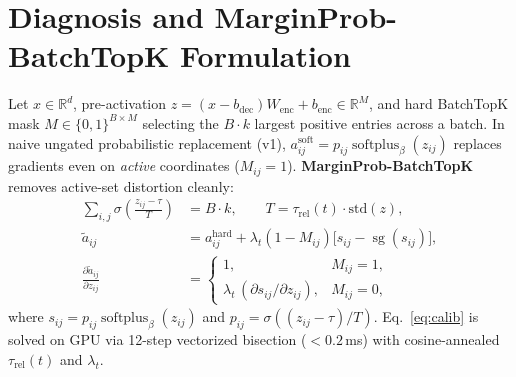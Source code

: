 \documentclass[10pt,twocolumn]{article}
\begin{document}
\section{Diagnosis and MarginProb-BatchTopK Formulation}
Let $x \in \mathbb{R}^d$, pre-activation $z = (x - b_{\mathrm{dec}})W_{\mathrm{enc}} + b_{\mathrm{enc}} \in \mathbb{R}^M$, and hard BatchTopK mask $M \in \{0,1\}^{B\times M}$ selecting the $B\cdot k$ largest positive entries across a batch. In naive ungated probabilistic replacement (v1), $a_{ij}^{\mathrm{soft}} = p_{ij}\operatorname{softplus}_\beta(z_{ij})$ replaces gradients even on \emph{active} coordinates ($M_{ij}=1$). \textbf{MarginProb-BatchTopK} removes active-set distortion cleanly:
\begin{align}
  \sum_{i,j} \sigma\!\left(\frac{z_{ij} - \tau}{T}\right) &= B\cdot k, \qquad T = \tau_{\mathrm{rel}}(t)\cdot \mathrm{std}(z), \label{eq:calib} \\
  \tilde{a}_{ij} &= a_{ij}^{\mathrm{hard}} + \lambda_t (1 - M_{ij})\Big[s_{ij} - \operatorname{sg}(s_{ij})\Big], \label{eq:mp} \\
  \frac{\partial \tilde{a}_{ij}}{\partial z_{ij}} &= \begin{cases} 1, & M_{ij}=1, \\ \lambda_t\,(\partial s_{ij} / \partial z_{ij}), & M_{ij}=0, \end{cases} \label{eq:mp_grad}
\end{align}
where $s_{ij} = p_{ij}\operatorname{softplus}_\beta(z_{ij})$ and $p_{ij} = \sigma((z_{ij} - \tau)/T)$.
Eq.~\eqref{eq:calib} is solved on GPU via 12-step vectorized bisection ($<0.2$\,ms) with cosine-annealed $\tau_{\mathrm{rel}}(t)$ and $\lambda_t$.
\end{document}

